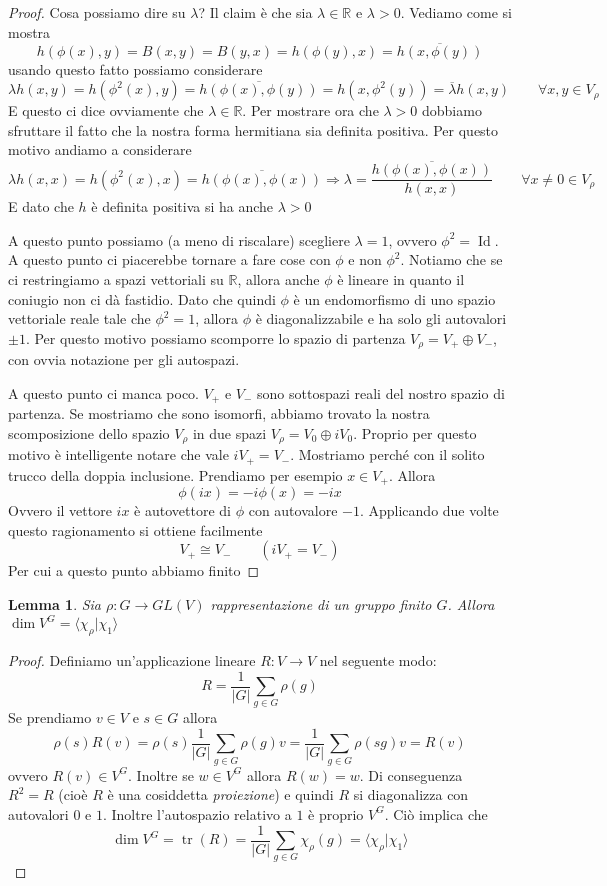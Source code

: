 \documentclass[11pt]{article}
\theoremstyle{plain}
\newtheorem{lemma}[thm]{Lemma}
\theoremstyle{definition}
\theoremstyle{remark}
\newcommand{\R}{\mathbb{R}}
\DeclareMathOperator{\tr}{tr}
\DeclareMathOperator{\Id}{Id}
\begin{document}
\begin{proof}
Cosa possiamo dire su $\lambda$? Il claim è che sia $\lambda \in \R$ e $\lambda > 0$. Vediamo come si mostra
\[h(\phi(x), y) = B(x, y) = B(y, x) = h(\phi(y), x) = \overline{h(x, \phi(y))} \]
usando questo fatto possiamo considerare 
\[ \lambda h(x, y) = h(\phi^2(x), y) = \overline{h(\phi(x), \phi(y))} = h(x, \phi^2(y)) = \overline{\lambda} h(x, y) \qquad \forall x, y \in V_\rho\]
E questo ci dice ovviamente che $\lambda \in \R$. Per mostrare ora che $\lambda > 0$ dobbiamo sfruttare il fatto che la nostra forma hermitiana sia definita positiva. Per questo motivo andiamo a considerare
\[\lambda h(x, x) = h (\phi^2(x), x) = \overline{h(\phi(x), \phi(x))} \Rightarrow \lambda = \dfrac{\overline{h(\phi(x), \phi(x))}}{ h(x,x)} \qquad \forall x \neq 0 \in V_\rho\]
E dato che $h $ è definita positiva si ha anche $\lambda > 0$

A questo punto possiamo (a meno di riscalare) scegliere $\lambda = 1$, ovvero $\phi^2 = \Id$. A questo punto ci piacerebbe tornare a fare cose con $\phi$ e non $\phi^2$. Notiamo che se ci restringiamo a spazi vettoriali su $\R$, allora anche $\phi$ è lineare in quanto il coniugio non ci dà fastidio. Dato che quindi $\phi$ è un endomorfismo di uno spazio vettoriale reale tale che $\phi^2=1$, allora $\phi$ è diagonalizzabile e ha solo gli autovalori $\pm 1$.  Per questo motivo possiamo scomporre lo spazio di partenza $V_\rho = V_+ \oplus V_-$, con ovvia notazione per gli autospazi.

A questo punto ci manca poco. $V_+$ e $V_-$ sono sottospazi reali del nostro spazio di partenza. Se mostriamo che sono isomorfi, abbiamo trovato la nostra scomposizione dello spazio $V_\rho$ in due spazi $V_\rho = V_0 \oplus iV_0$.
Proprio per questo motivo è intelligente notare che vale $i V_+ = V_-$.
Mostriamo perché con il solito trucco della doppia inclusione. Prendiamo per esempio $x \in V_+$. Allora 
\[ \phi(ix) = - i \phi(x) = -i x \]
Ovvero il vettore $ix$ è autovettore di $\phi$ con autovalore $-1$. Applicando due volte questo ragionamento si ottiene facilmente
\[ V_+ \cong V_- \qquad (i V_+ = V_-)\]
Per cui a questo punto abbiamo finito
\end{proof}


\begin{lemma}
Sia $\rho:G\to GL(V)$ rappresentazione di un gruppo finito $G$. Allora $\dim V^G = \langle\chi_\rho|\chi_1\rangle$
\end{lemma}
\begin{proof}
Definiamo un'applicazione lineare $R:V\to V$ nel seguente modo:
\[ R = \frac{1}{|G|} \sum_{g\in G}{\rho(g)} \]
Se prendiamo $v\in V$ e $s\in G$ allora
\[ \rho(s) R(v) = \rho(s)\frac{1}{|G|} \sum_{g\in G}{\rho(g)v} = \frac{1}{|G|} \sum_{g\in G}{\rho(sg)v} = R(v)\]
ovvero $R(v)\in V^G$.
Inoltre se $w\in V^G$ allora $R(w)=w$. Di conseguenza $R^2 = R$ (cioè $R$ è una cosiddetta \emph{proiezione})
e quindi $R$ si diagonalizza con autovalori $0$ e $1$. Inoltre l'autospazio relativo a $1$ è proprio $V^G$.
Ciò implica che
\[ \dim V^G = \tr(R) = \frac{1}{|G|} \sum_{g\in G}{\chi_\rho(g)} = \langle\chi_\rho|\chi_1\rangle \]
\end{proof}
\end{document}
